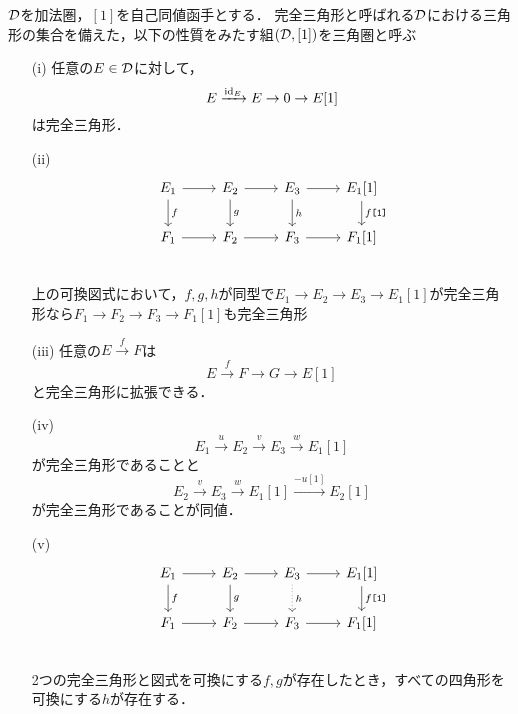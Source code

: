\begin{defn}
	${\mathcal D}$を加法圏，$[1]$を自己同値函手とする．
	完全三角形と呼ばれる${\mathcal D}$における三角形の集合を備えた，以下の性質をみたす組$({\mathcal D},[1])$を三角圏と呼ぶ$$$$
	\vspace{-3mm}
	\begin{itemize}
		\item[(i)]
			任意の$E\in{\mathcal D}$に対して，
			\[E\xrightarrow{\mathrm{id}_E}E\rightarrow 0 \rightarrow E[1]\]
			は完全三角形．
		\item[(ii)]
			\[
		\begin{tikzcd}
			E_1\ar[r]\ar[d,"f"]& E_2\ar[r]\ar[d,"g"]& E_3\ar[r]\ar[d,"h"] & E_1[1]\ar[d,"f\texttt{[1]}"]\\
			F_1\ar[r]& F_2\ar[r]& F_3\ar[r] & F_1[1]\\
		\end{tikzcd}
			\]
			上の可換図式において，$f,g,h$が同型で$E_1\rightarrow E_2\rightarrow E_3 \rightarrow E_1[1]$が完全三角形なら$F_1\rightarrow F_2\rightarrow F_3 \rightarrow F_1[1]$も完全三角形
		\item[(iii)]
			任意の$E\xrightarrow{f}F$は
			\[E\xrightarrow{f} F\rightarrow G \rightarrow E[1]\]
		と完全三角形に拡張できる．
	\item[(iv)]
		\[
			E_1\xrightarrow{u} E_2\xrightarrow{v} E_3\xrightarrow{w}  E_1[1]
	\]
	が完全三角形であることと
	\[
		E_2\xrightarrow{v} E_3\xrightarrow{w} E_1[1]\xrightarrow{-u[1]}  E_2[1]
	\]
	が完全三角形であることが同値．
	\item[(v)]
		\[
		\begin{tikzcd}
			E_1\ar[r]\ar[d,"f"]& E_2\ar[r]\ar[d,"g"]& E_3\ar[r]\ar[d,"h",dotted] & E_1[1]\ar[d,"f\texttt{[1]}"]\\
			F_1\ar[r]& F_2\ar[r]& F_3\ar[r] & F_1[1]\\
		\end{tikzcd}
	\]
	2つの完全三角形と図式を可換にする$f,g$が存在したとき，すべての四角形を可換にする$h$が存在する．


\end{itemize}
\end{defn}
